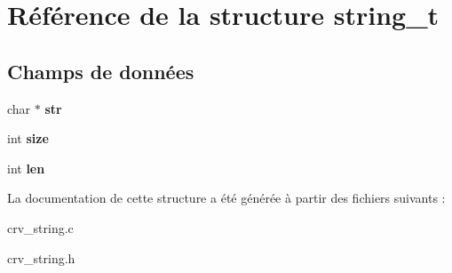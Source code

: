 \hypertarget{structstring__t}{\section{Référence de la structure string\-\_\-t}
\label{structstring__t}
}
\subsection*{Champs de données}
\begin{DoxyCompactItemize}
\item 
\hypertarget{structstring__t_a3e6c64a4b8fd9c31b174ce283f0a8bbf}{char $\ast$ {\bfseries str}}\label{structstring__t_a3e6c64a4b8fd9c31b174ce283f0a8bbf}

\item 
\hypertarget{structstring__t_a439227feff9d7f55384e8780cfc2eb82}{int {\bfseries size}}\label{structstring__t_a439227feff9d7f55384e8780cfc2eb82}

\item 
\hypertarget{structstring__t_afed088663f8704004425cdae2120b9b3}{int {\bfseries len}}\label{structstring__t_afed088663f8704004425cdae2120b9b3}

\end{DoxyCompactItemize}


La documentation de cette structure a été générée à partir des fichiers suivants \-:\begin{DoxyCompactItemize}
\item 
crv\-\_\-string.\-c\item 
crv\-\_\-string.\-h\end{DoxyCompactItemize}
